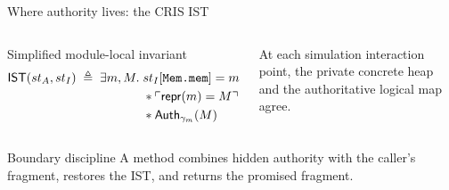 \documentclass[aspectratio=169,10pt]{beamer}
\newcommand{\Sep}{\mathbin{*}}
\newcommand{\AuthM}[1]{\mathsf{Auth}_{\gamma_m}(#1)}
\newcommand{\ptfull}[2]{#1\mathrel{\mapsto_{\gamma_m}}#2}
\newcommand{\code}[1]{\texttt{\detokenize{#1}}}
\begin{document}
\begin{frame}{Where authority lives: the CRIS IST}
  \begin{columns}[T,onlytextwidth]
      \begin{block}{Simplified module-local invariant}
      \[
      \begin{aligned}
      \mathsf{IST}(st_A,st_I)\;\triangleq\;\exists m,M.\;&
        st_I[\code{Mem.mem}]=m \\
        &{}\Sep \ulcorner\mathsf{repr}(m)=M\urcorner \\
        &{}\Sep \AuthM{M}
      \end{aligned}
      \]
      \end{block}
      \small
      At each simulation interaction point, the private concrete heap and the authoritative logical map agree.

  \end{columns}

  \vspace{0.25cm}
  \begin{exampleblock}{Boundary discipline}
    A method combines hidden authority with the caller's fragment, restores the IST, and returns the promised fragment.
  \end{exampleblock}
\end{frame}
\end{document}

